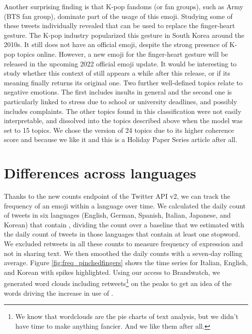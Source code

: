 \documentclass{article}
\begin{document}
Another surprising finding is that K-pop fandoms (or fan groups), such as Army (BTS fan group), dominate part of the usage of this emoji. Studying some of these tweets individually revealed that  can be used to replace the finger-heart gesture. The K-pop industry popularized this gesture in South Korea around the 2010s. It still does not have an official emoji, despite the strong presence of K-pop topics online. However, a new emoji for the finger-heart gesture will be released in the upcoming 2022 official emoji update. It would be interesting to study whether this context of  still appears a while after this release, or if its meaning finally returns its original one. 
Two further well-defined topics relate to negative emotions. The first includes insults in general and the second one is particularly linked to stress due to school or university deadlines, and possibly includes complaints. The other topics found in this classification were not easily interpretable, and dissolved into the topics described above when the model was set to 15 topics. We chose the version of 24 topics due to its higher coherence score and because we like it and this is a Holiday Paper Series article after all.

\section{Differences across languages}

Thanks to the new counts endpoint of the Twitter API v2, we can track the frequency of an emoji within a language over time. We calculated the daily count of tweets in six languages (English, German, Spanish, Italian, Japanese, and Korean) that contain , dividing the count over a baseline that we estimated with the daily count of tweets in those languages that contain at least one stopword. We excluded retweets in all these counts to measure frequency of expression and not in sharing text. We then smoothed the daily counts with a seven-day rolling average. Figure \ref{fig:freq_pinchedfingers} shows the time series for Italian, English, and Korean with spikes highlighted. Using our access to Brandwatch, we generated word clouds including retweets\footnote{We know that wordclouds are the pie charts of text analysis, but we didn't have time to make anything fancier. And we like them after all.} on the peaks to get an idea of the words driving the increase in use of .
\end{document}
